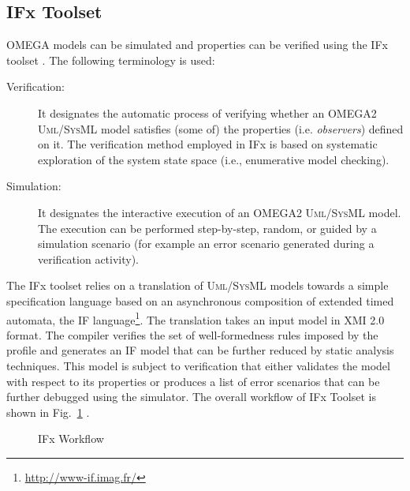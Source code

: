 \documentclass[a4paper,twoside]{article}
\def\sysml{\textsc{SysML}}
\def\uml{\textsc{Uml}}
\begin{document}
\subsection{IFx Toolset}

\noindent OMEGA models can be simulated and properties can be verified using the IFx toolset \cite{test13}. The following terminology is used: 

\begin{description}
\item[Verification:] It designates  the  automatic  process  of  verifying  whether  an  OMEGA2  \uml{}/\sysml{} model  satisfies  (some  of)  the  properties  (i.e. \textit{observers})  defined  on  it.  The  verification  method employed in IFx is based on systematic exploration of the system state space (i.e., enumerative model checking). 
\item[Simulation:] It designates  the  interactive  execution  of  an  OMEGA2  \uml{}/\sysml{}  model.  The execution  can    be  performed  step-by-step,  random,  or  guided  by  a  simulation  scenario  (for example an error scenario generated during a verification activity). 
\end{description}

The IFx toolset relies on a translation of \uml{}/\sysml{} models towards a simple specification language based on an asynchronous composition of extended timed automata, the IF language\footnote{\url{http://www-if.imag.fr/}}. The translation takes an input model in XMI 2.0 format. 
The compiler verifies the set of well-formedness rules imposed by the profile and generates an IF model that can be further reduced by static analysis techniques. This model is subject to verification that either validates the model with respect to its properties or produces a list of error scenarios that can be further debugged using the simulator. The overall workflow  of IFx Toolset is shown in Fig.~\ref{fig:flow} \cite{test14}.

\begin{figure}[!htb]
  \centering
  {}
  \caption{IFx Workflow}
  \label{fig:flow}
\end{figure}
 
\end{document}
